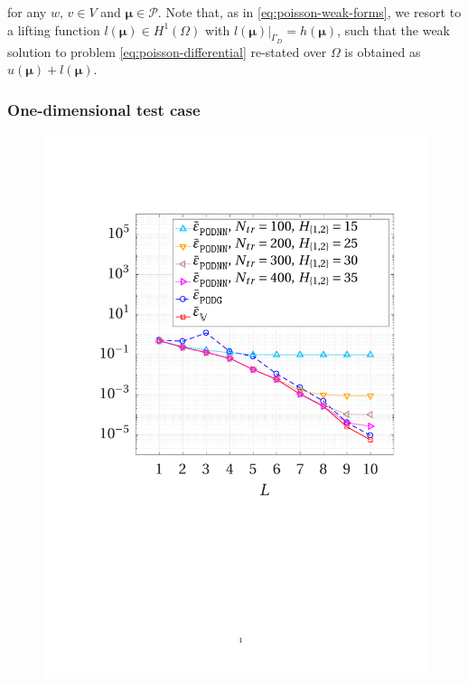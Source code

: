\documentclass[longtitle]{elsarticle}
\numberwithin{equation}{section}
\theoremstyle{theorem}
\theoremstyle{definition}
\theoremstyle{remark}
\theoremstyle{proposition}
\numberwithin{figure}{section}
\newcommand{\bg}[1]{\boldsymbol{#1}}
\begin{document}
		for any $w$, $v \in V$ and $\bg{\mu} \in \mathcal{P}$. Note that, as in \eqref{eq:poisson-weak-forms}, we resort to a lifting function $l(\bg{\mu}) \in H^1(\Omega)$ with $l(\bg{\mu}) \big\rvert_{\Gamma_D} = h(\bg{\mu})$, such that the weak solution to problem \eqref{eq:poisson-differential} re-stated over $\Omega$ is obtained as $u(\bg{\mu}) + l(\bg{\mu})$.
		
		
		
	\subsubsection{One-dimensional test case}
	\label{section:One-dimensional test case}
	
		\begin{figure}[b!]
			\center
			\includegraphics[scale = 0.385, trim = {1cm 9.5cm 1cm 3.5cm}, clip]{poisson1d_error_vs_rank}

\end{figure}
\end{document}
